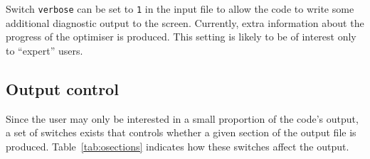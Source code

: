 \documentclass[11pt,a4paper]{report}
\begin{document}
Switch \texttt{verbose} can be set to \texttt{1} in the input file to allow
the code to write some additional diagnostic output to the screen. Currently,
extra information about the progress of the optimiser is produced. This
setting is likely to be of interest only to ``expert'' users.

\subsection{Output control}

Since the user may only be interested in a small proportion of the code's
output, a set of switches exists that controls whether a given section of the
output file is produced.  Table~\ref{tab:osections} indicates how these
switches affect the output.

\end{document}

